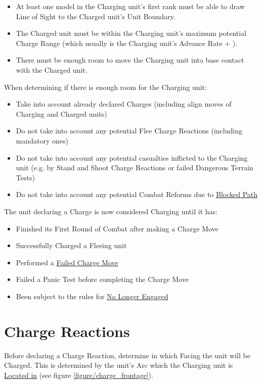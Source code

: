 \begin{itemize}
\item At least one model in the Charging unit's first rank must be able to draw Line of Sight to the Charged unit's Unit Boundary.
\item The Charged unit must be within the Charging unit's maximum potential Charge Range (which usually is the Charging unit's Advance Rate + ).
\item There must be enough room to move the Charging unit into base contact with the Charged unit.
\end{itemize}

When determining if there is enough room for the Charging unit:
\begin{itemize}
\item Take into account already declared Charges (including align moves of Charging and Charged units)
\item Do not take into account any potential Flee Charge Reactions (including mandatory ones)
\item Do not take into account any potential casualties inflicted to the Charging unit (e.g. by Stand and Shoot Charge Reactions or failed Dangerous Terrain Tests)
\item Do not take into account any potential Combat Reforms due to \hyperref[blocked_path]{Blocked Path}
\end{itemize}

The unit declaring a Charge is now considered Charging until it has:

\begin{itemize}
\item Finished its First Round of Combat after making a Charge Move
\item Successfully Charged a Fleeing unit
\item Performed a \hyperref[failed_charge]{Failed Charge Move}
\item Failed a Panic Test before completing the Charge Move
\item Been subject to the rules for \hyperref[no_longer_engaged]{No Longer Engaged}
\end{itemize}

\section{Charge Reactions}
\label{charge_reactions}

Before declaring a Charge Reaction, determine in which Facing the unit will be Charged. This is determined by the unit's Arc which the Charging unit is \hyperref[unit_arcs]{Located in} (see figure \ref{figure/charge_frontage}).

